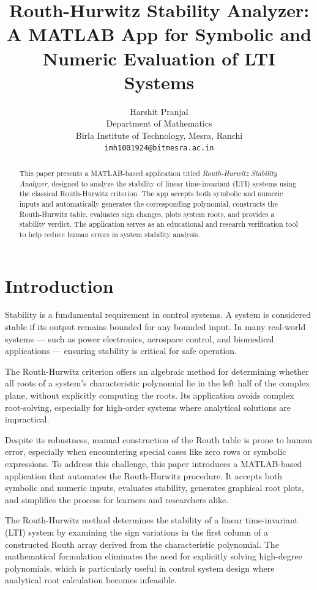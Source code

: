 \documentclass[11pt]{article}
\title{Routh-Hurwitz Stability Analyzer: A MATLAB App for Symbolic and Numeric Evaluation of LTI Systems}
\author{Harshit Pranjal \\
Department of Mathematics \\
Birla Institute of Technology, Mesra, Ranchi \\
\texttt{imh1001924@bitmesra.ac.in}}
\date{}
\begin{document}
\maketitle

\begin{abstract}
This paper presents a MATLAB-based application titled \emph{Routh-Hurwitz Stability Analyzer}, designed to analyze the stability of linear time-invariant (LTI) systems using the classical Routh-Hurwitz criterion. The app accepts both symbolic and numeric inputs and automatically generates the corresponding polynomial, constructs the Routh-Hurwitz table, evaluates sign changes, plots system roots, and provides a stability verdict. The application serves as an educational and research verification tool to help reduce human errors in system stability analysis.
\end{abstract}

\section{Introduction}
Stability is a fundamental requirement in control systems. A system is considered stable if its output remains bounded for any bounded input. In many real-world systems — such as power electronics, aerospace control, and biomedical applications — ensuring stability is critical for safe operation.

The Routh-Hurwitz criterion offers an algebraic method for determining whether all roots of a system's characteristic polynomial lie in the left half of the complex plane, without explicitly computing the roots. Its application avoids complex root-solving, especially for high-order systems where analytical solutions are impractical.

Despite its robustness, manual construction of the Routh table is prone to human error, especially when encountering special cases like zero rows or symbolic expressions. To address this challenge, this paper introduces a MATLAB-based application that automates the Routh-Hurwitz procedure. It accepts both symbolic and numeric inputs, evaluates stability, generates graphical root plots, and simplifies the process for learners and researchers alike.

The Routh-Hurwitz method determines the stability of a linear time-invariant (LTI) system by examining the sign variations in the first column of a constructed Routh array derived from the characteristic polynomial. The mathematical formulation eliminates the need for explicitly solving high-degree polynomials, which is particularly useful in control system design where analytical root calculation becomes infeasible.
\end{document}
